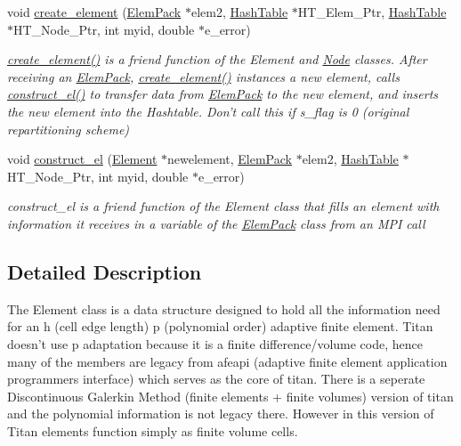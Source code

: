 \begin{CompactItemize}
\item 
void \hyperlink{classElement_n12}{create\_\-element} (\hyperlink{structElemPack}{Elem\-Pack} $\ast$elem2, \hyperlink{classHashTable}{Hash\-Table} $\ast$HT\_\-Elem\_\-Ptr, \hyperlink{classHashTable}{Hash\-Table} $\ast$HT\_\-Node\_\-Ptr, int myid, double $\ast$e\_\-error)
\begin{CompactList}\small\item\em \hyperlink{classElement_n12}{create\_\-element()} is a friend function of the Element and \hyperlink{classNode}{Node} classes. After receiving an \hyperlink{structElemPack}{Elem\-Pack}, \hyperlink{classElement_n12}{create\_\-element()} instances a new element, calls \hyperlink{classElement_n13}{construct\_\-el()} to transfer data from \hyperlink{structElemPack}{Elem\-Pack} to the new element, and inserts the new element into the Hashtable. Don't call this if s\_\-flag is 0 (original repartitioning scheme) \item\end{CompactList}\item 
void \hyperlink{classElement_n13}{construct\_\-el} (\hyperlink{classElement}{Element} $\ast$newelement, \hyperlink{structElemPack}{Elem\-Pack} $\ast$elem2, \hyperlink{classHashTable}{Hash\-Table} $\ast$HT\_\-Node\_\-Ptr, int myid, double $\ast$e\_\-error)
\begin{CompactList}\small\item\em construct\_\-el is a friend function of the Element class that fills an element with information it receives in a variable of the \hyperlink{structElemPack}{Elem\-Pack} class from an MPI call \item\end{CompactList}\end{CompactItemize}


\subsection{Detailed Description}
The Element class is a data structure designed to hold all the information need for an h (cell edge length) p (polynomial order) adaptive finite element. Titan doesn't use p adaptation because it is a finite difference/volume code, hence many of the members are legacy from afeapi (adaptive finite element application programmers interface) which serves as the core of titan. There is a seperate Discontinuous Galerkin Method (finite elements + finite volumes) version of titan and the polynomial information is not legacy there. However in this version of Titan elements function simply as finite volume cells. 



